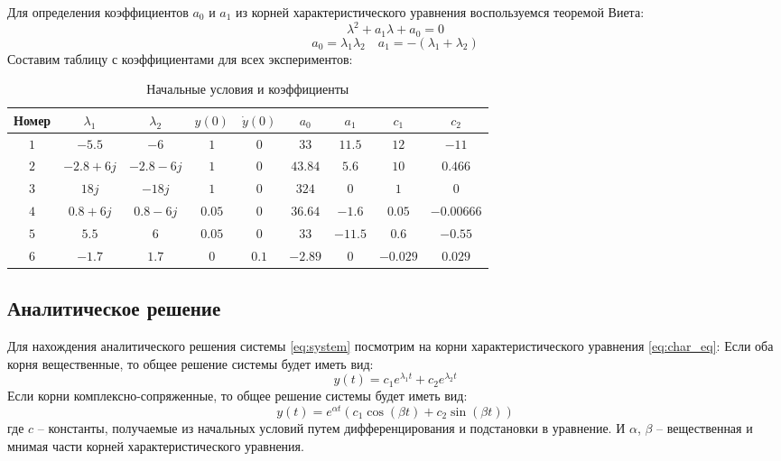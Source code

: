 Для определения коэффициентов $a_0$ и $a_1$ из корней характеристического уравнения воспользуемся теоремой Виета:
\begin{equation}
    \lambda^2 + a_1 \lambda + a_0 = 0
    \label{eq:char_eq}
\end{equation}
\begin{equation}
    a_0 = \lambda_1 \lambda_2\quad a_1 = -(\lambda_1 + \lambda_2)
\end{equation}
Составим таблицу с коэффициентами для всех экспериментов:
\begin{table}[ht!]
    \centering
    \begin{tabular}{|c|c|c|c|c|c|c|c|c|}
        \hline
        Номер & $\lambda_1$ & $\lambda_2$ & $y(0)$ & $\dot{y}(0)$ & $a_0$ & $a_1$ & $c_1$ & $c_2$ \\
        \hline
        $1$ & $-5.5$ & $-6$ & $1$ & $0$ & $33$ & $11.5$ & $12$ & $-11$ \\
        \hline
        $2$ & $-2.8 + 6j$ & $-2.8 - 6j$ & $1$ & $0$ & $43.84$ & $5.6$ & $10$ & $0.466$\\
        \hline
        $3$ & $18j$ & $-18j$ & $1$ & $0$ & $324$ & $0$ & $1$ & $0$\\
        \hline
        $4$ & $0.8 + 6j$ & $0.8 - 6j$ & $0.05$ & $0$ & $36.64$ & $-1.6$ & $0.05$ & $-0.00666$ \\
        \hline
        $5$ & $5.5$ & $6$ & $0.05$ & $0$ & $33$ & $-11.5$ & $0.6$ & $-0.55$\\
        \hline
        $6$ & $-1.7$ & $1.7$ & $0$ & $0.1$ & $-2.89$ & $0$ & $-0.029$ & $0.029$\\
        \hline
    \end{tabular}
    \caption{Начальные условия и коэффициенты}
    \label{tab:initial_conditions}
\end{table}


\subsection{Аналитическое решение} 
Для нахождения аналитического решения системы \ref{eq:system} посмотрим на корни характеристического уравнения \ref{eq:char_eq}:
Если оба корня вещественные, то общее решение системы будет иметь вид:
\begin{equation}
    y(t) = c_1 e^{\lambda_1 t} + c_2 e^{\lambda_2 t}
\end{equation}
Если корни комплексно-сопряженные, то общее решение системы будет иметь вид:
\begin{equation}
    y(t) = e^{\alpha t} \left( c_1 \cos(\beta t) + c_2 \sin(\beta t) \right)
\end{equation}
где $c$ -- константы, получаемые из начальных условий путем дифференцирования и подстановки в уравнение. 
И $\alpha$, $\beta$ -- вещественная и мнимая части корней характеристического уравнения.

